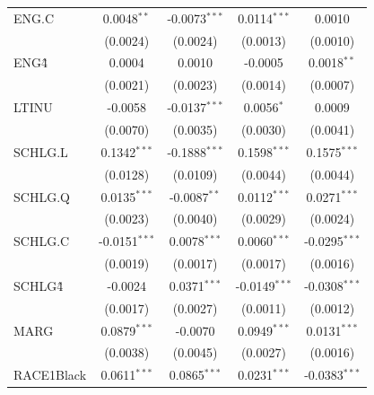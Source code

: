 \begin{tabular}{lcccc}
   ENG.C                                     & 0.0048$^{**}$   & -0.0073$^{***}$ & 0.0114$^{***}$  & 0.0010\\   
                                             & (0.0024)        & (0.0024)        & (0.0013)        & (0.0010)\\   
   ENG\^4                                    & 0.0004          & 0.0010          & -0.0005         & 0.0018$^{**}$\\   
                                             & (0.0021)        & (0.0023)        & (0.0014)        & (0.0007)\\   
   LTINU                                     & -0.0058         & -0.0137$^{***}$ & 0.0056$^{*}$    & 0.0009\\   
                                             & (0.0070)        & (0.0035)        & (0.0030)        & (0.0041)\\   
   SCHLG.L                                   & 0.1342$^{***}$  & -0.1888$^{***}$ & 0.1598$^{***}$  & 0.1575$^{***}$\\   
                                             & (0.0128)        & (0.0109)        & (0.0044)        & (0.0044)\\   
   SCHLG.Q                                   & 0.0135$^{***}$  & -0.0087$^{**}$  & 0.0112$^{***}$  & 0.0271$^{***}$\\   
                                             & (0.0023)        & (0.0040)        & (0.0029)        & (0.0024)\\   
   SCHLG.C                                   & -0.0151$^{***}$ & 0.0078$^{***}$  & 0.0060$^{***}$  & -0.0295$^{***}$\\   
                                             & (0.0019)        & (0.0017)        & (0.0017)        & (0.0016)\\   
   SCHLG\^4                                  & -0.0024         & 0.0371$^{***}$  & -0.0149$^{***}$ & -0.0308$^{***}$\\   
                                             & (0.0017)        & (0.0027)        & (0.0011)        & (0.0012)\\   
   MARG                                      & 0.0879$^{***}$  & -0.0070         & 0.0949$^{***}$  & 0.0131$^{***}$\\   
                                             & (0.0038)        & (0.0045)        & (0.0027)        & (0.0016)\\   
   RACE1Black                                & 0.0611$^{***}$  & 0.0865$^{***}$  & 0.0231$^{***}$  & -0.0383$^{***}$\\   

\end{tabular}
